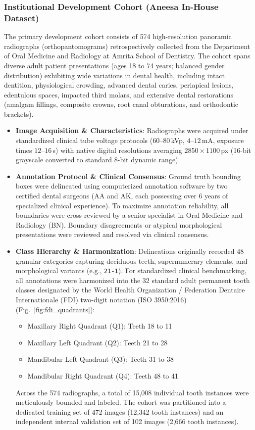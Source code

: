 \documentclass[10pt,journal,compsoc]{IEEEtran}
\begin{document}
\subsubsection{Institutional Development Cohort (Aneesa In-House Dataset)}
The primary development cohort consists of 574 high-resolution panoramic radiographs (orthopantomograms) retrospectively collected from the Department of Oral Medicine and Radiology at Amrita School of Dentistry. The cohort spans diverse adult patient presentations (ages 18 to 74 years; balanced gender distribution) exhibiting wide variations in dental health, including intact dentition, physiological crowding, advanced dental caries, periapical lesions, edentulous spaces, impacted third molars, and extensive dental restorations (amalgam fillings, composite crowns, root canal obturations, and orthodontic brackets).
\begin{itemize}
    \item \textbf{Image Acquisition \& Characteristics}: Radiographs were acquired under standardized clinical tube voltage protocols ($60\text{--}80$\,kVp, $4\text{--}12$\,mA, exposure times $12\text{--}16$\,s) with native digital resolutions averaging $2850 \times 1100$\,px (16-bit grayscale converted to standard 8-bit dynamic range).
    \item \textbf{Annotation Protocol \& Clinical Consensus}: Ground truth bounding boxes were delineated using computerized annotation software by two certified dental surgeons (AA and AK, each possessing over 6 years of specialized clinical experience). To maximize annotation reliability, all boundaries were cross-reviewed by a senior specialist in Oral Medicine and Radiology (BN). Boundary disagreements or atypical morphological presentations were reviewed and resolved via clinical consensus.
    \item \textbf{Class Hierarchy \& Harmonization}: Delineations originally recorded 48 granular categories capturing deciduous teeth, supernumerary elements, and morphological variants (e.g., \texttt{21-1}). For standardized clinical benchmarking, all annotations were harmonized into the 32 standard adult permanent tooth classes designated by the World Health Organization / Federation Dentaire Internationale (FDI) two-digit notation (ISO 3950:2016)~\cite{fdi1971,iso3950} (Fig.~\ref{fig:fdi_quadrants}):
    \begin{itemize}
        \item Maxillary Right Quadrant (Q1): Teeth 18 to 11
        \item Maxillary Left Quadrant (Q2): Teeth 21 to 28
        \item Mandibular Left Quadrant (Q3): Teeth 31 to 38
        \item Mandibular Right Quadrant (Q4): Teeth 48 to 41
    \end{itemize}
    Across the 574 radiographs, a total of 15,008 individual tooth instances were meticulously bounded and labeled. The cohort was partitioned into a dedicated training set of 472 images (12,342 tooth instances) and an independent internal validation set of 102 images (2,666 tooth instances).
\end{itemize}
\end{document}
